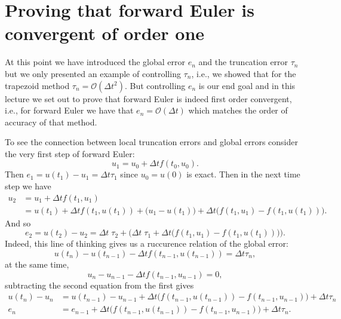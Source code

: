 \chapter{Proving that forward Euler is convergent of 
order one}

At this point we have introduced the global error $e_n$ and 
the truncation error $\tau_n$ but we only presented an 
example of controlling $\tau_n$, i.e., we showed that 
for the trapezoid method $\tau_n = \mathcal{O}(\Delta t^2)$. 
But controlling $e_n$ is our end goal and in this lecture we 
set out to prove that forward Euler is indeed first order 
convergent, i.e., for forward Euler we have that 
$e_n = \mathcal{O}(\Delta t)$ which matches the order of 
accuracy of that method. 

To see the connection between local truncation errors 
and global errors consider the very first step of forward 
Euler: 
\begin{equation*}
    u_1 = u_0 + \Delta t f(t_0, u_0).
\end{equation*}
Then $e_1 = u(t_1) - u_1 = \Delta t \tau_1$ since $u_0 = u(0)$ is exact. 
Then in the next time step we have 
\begin{equation*}
    \begin{aligned}
    u_2 & = u_1 + \Delta t f(t_1, u_1) \\
        & = u(t_1) + \Delta t f(t_1, u(t_1)) +
        \Big(u_1 - u(t_1)\Big) + \Delta t 
        \Big( f(t_1, u_1) - f(t_1, u(t_1)) \Big).
    \end{aligned}
\end{equation*}
And so 
\begin{equation*}
    e_2 = u(t_2) - u_2 = \Delta t \; \tau_2 + \Big( \Delta t \; \tau_1 + \Delta t 
        \Big( f(t_1, u_1) - f(t_1, u(t_1)) \Big) \Big).
\end{equation*}
Indeed, this line of thinking gives us a ruccurence relation of 
the global error: 
\begin{equation*}
    u(t_n) - u(t_{n-1}) - \Delta t f(t_{n-1}, u(t_{n-1})) 
    = \Delta t \tau_n,
\end{equation*}
at the same time, 
\begin{equation*}
    u_n - u_{n-1} - \Delta t f(t_{n-1}, u_{n-1}) = 0,
\end{equation*}    
subtracting the second equation from the first gives
\begin{equation*}
    \begin{aligned}
        u(t_n) - u_n & = u(t_{n-1}) - u_{n-1} + 
        \Delta t 
        \Big( f(t_{n-1}, u(t_{n-1})) - f(t_{n-1}, u_{n-1}) \Big)
        + \Delta t \tau_n \\ 
        e_n & = e_{n-1} + \Delta t 
        \Big( f(t_{n-1}, u(t_{n-1})) - f(t_{n-1}, u_{n-1}) \Big) 
        + \Delta t \tau_n.
    \end{aligned}
\end{equation*}
